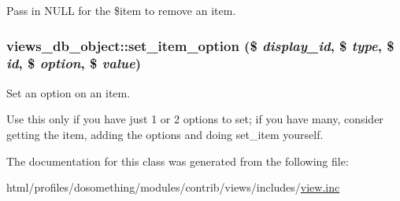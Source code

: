 Pass in NULL for the \$item to remove an item. \hypertarget{classviews__db__object_a722d39805c26c9ae909e644f2f887a86}{
\subsubsection[{set\_\-item\_\-option}]{\setlength{\rightskip}{0pt plus 5cm}views\_\-db\_\-object::set\_\-item\_\-option (\$ {\em display\_\-id}, \/  \$ {\em type}, \/  \$ {\em id}, \/  \$ {\em option}, \/  \$ {\em value})}}
\label{classviews__db__object_a722d39805c26c9ae909e644f2f887a86}
Set an option on an item.

Use this only if you have just 1 or 2 options to set; if you have many, consider getting the item, adding the options and doing set\_\-item yourself. 

The documentation for this class was generated from the following file:\begin{DoxyCompactItemize}
\item 
html/profiles/dosomething/modules/contrib/views/includes/\hyperlink{views_2includes_2view_8inc}{view.inc}\end{DoxyCompactItemize}
